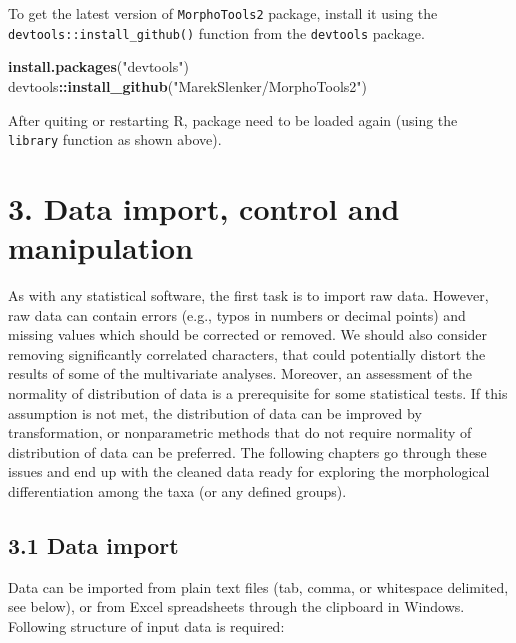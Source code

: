 \documentclass[
]{article}
\newenvironment{Shaded}{\begin{snugshade}}{\end{snugshade}}
\newcommand{\KeywordTok}[1]{\textcolor[rgb]{0.13,0.29,0.53}{\textbf{#1}}}
\newcommand{\NormalTok}[1]{#1}
\newcommand{\OperatorTok}[1]{\textcolor[rgb]{0.81,0.36,0.00}{\textbf{#1}}}
\newcommand{\StringTok}[1]{\textcolor[rgb]{0.31,0.60,0.02}{#1}}
\begin{document}
To get the latest version of \texttt{MorphoTools2} package, install it
using the \texttt{devtools::install\_github()} function from the
\texttt{devtools} package.

\begin{Shaded}
\begin{Highlighting}[]
\KeywordTok{install.packages}\NormalTok{(}\StringTok{"devtools"}\NormalTok{)}
\NormalTok{devtools}\OperatorTok{::}\KeywordTok{install_github}\NormalTok{(}\StringTok{"MarekSlenker/MorphoTools2"}\NormalTok{)}
\end{Highlighting}
\end{Shaded}

After quiting or restarting R, package need to be loaded again (using
the \texttt{library} function as shown above).

\hypertarget{data-import-control-and-manipulation}{%
\section{3. Data import, control and
manipulation}\label{data-import-control-and-manipulation}}

As with any statistical software, the first task is to import raw data.
However, raw data can contain errors (e.g., typos in numbers or decimal
points) and missing values which should be corrected or removed. We
should also consider removing significantly correlated characters, that
could potentially distort the results of some of the multivariate
analyses. Moreover, an assessment of the normality of distribution of
data is a prerequisite for some statistical tests. If this assumption is
not met, the distribution of data can be improved by transformation, or
nonparametric methods that do not require normality of distribution of
data can be preferred. The following chapters go through these issues
and end up with the cleaned data ready for exploring the morphological
differentiation among the taxa (or any defined groups).

\hypertarget{data-import}{%
\subsection{3.1 Data import}\label{data-import}}

Data can be imported from plain text files (tab, comma, or whitespace
delimited, see below), or from Excel spreadsheets through the clipboard
in Windows. Following structure of input data is required:
\end{document}
